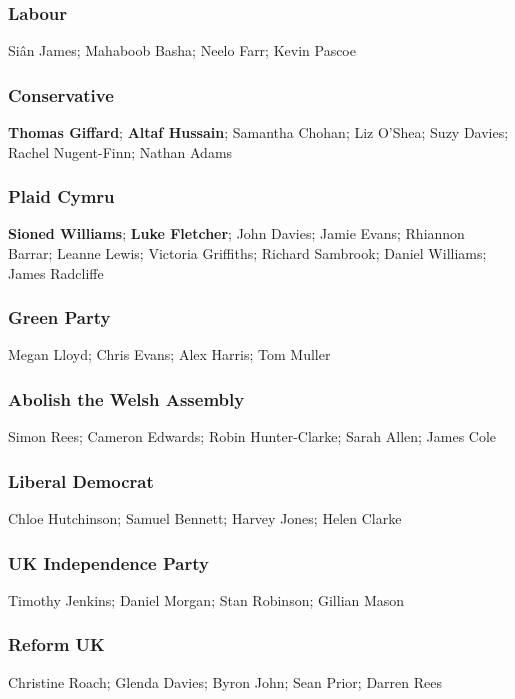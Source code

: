 \begin{resultsiii}
	\subsubsection*{Labour}
	Siân James; Mahaboob Basha; Neelo Farr; Kevin Pascoe
	
	\subsubsection*{Conservative}
	\textbf{Thomas Giffard}; \textbf{Altaf Hussain}; Samantha Chohan; Liz O'Shea; Suzy Davies; Rachel Nugent-Finn; Nathan Adams
	
	\subsubsection*{Plaid Cymru}
	\textbf{Sioned Williams}; \textbf{Luke Fletcher}; John Davies; Jamie Evans; Rhiannon Barrar; Leanne Lewis; Victoria Griffiths; Richard Sambrook; Daniel Williams; James Radcliffe
	
	\subsubsection*{Green Party}
	Megan Lloyd; Chris Evans; Alex Harris; Tom Muller
	
	\subsubsection*{Abolish the Welsh Assembly}
	Simon Rees; Cameron Edwards; Robin Hunter-Clarke; Sarah Allen; James Cole
	
	\subsubsection*{Liberal Democrat}
	Chloe Hutchinson; Samuel Bennett; Harvey Jones; Helen Clarke
	
	\subsubsection*{UK Independence Party}
	Timothy Jenkins; Daniel Morgan; Stan Robinson; Gillian Mason
	
	\subsubsection*{Reform UK}
	Christine Roach; Glenda Davies; Byron John; Sean Prior; Darren Rees
	

\end{resultsiii}
